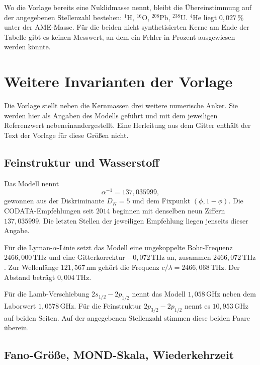 \documentclass[11pt,a4paper]{article}
\theoremstyle{definition}
\theoremstyle{remark}
\newcommand{\phig}{\phi}
\begin{document}
Wo die Vorlage bereits eine Nuklidmasse nennt, bleibt die Übereinstimmung auf der angegebenen Stellenzahl bestehen: \(^{1}\mathrm{H}\), \(^{16}\mathrm{O}\), \(^{208}\mathrm{Pb}\), \(^{238}\mathrm{U}\). \(^{4}\mathrm{He}\) liegt \(0{,}027\,\%\) unter der AME-Masse. Für die beiden nicht synthetisierten Kerne am Ende der Tabelle gibt es keinen Messwert, an dem ein Fehler in Prozent ausgewiesen werden könnte.

\section{Weitere Invarianten der Vorlage}
\label{sec:invarianten}

Die Vorlage stellt neben die Kernmassen drei weitere numerische Anker. Sie werden hier als Angaben des Modells geführt und mit dem jeweiligen Referenzwert nebeneinandergestellt. Eine Herleitung aus dem Gitter enthält der Text der Vorlage für diese Größen nicht.

\subsection{Feinstruktur und Wasserstoff}

Das Modell nennt
\begin{equation}
\alpha^{-1}=137{,}035999,
\end{equation}
gewonnen aus der Diskriminante \(D_K=5\) und dem Fixpunkt \((\phig,1-\phig)\). Die CODATA-Empfehlungen seit \(2014\) beginnen mit denselben neun Ziffern \(137{,}035999\). Die letzten Stellen der jeweiligen Empfehlung liegen jenseits dieser Angabe.

Für die Lyman-\(\alpha\)-Linie setzt das Modell eine ungekoppelte Bohr-Frequenz \(2466{,}000\,\mathrm{THz}\) und eine Gitterkorrektur \(+0{,}072\,\mathrm{THz}\) an, zusammen \(2466{,}072\,\mathrm{THz}\). Zur Wellenlänge \(121{,}567\,\mathrm{nm}\) gehört die Frequenz \(c/\lambda=2466{,}068\,\mathrm{THz}\). Der Abstand beträgt \(0{,}004\,\mathrm{THz}\).

Für die Lamb-Verschiebung \(2s_{1/2}-2p_{1/2}\) nennt das Modell \(1{,}058\,\mathrm{GHz}\) neben dem Laborwert \(1{,}0578\,\mathrm{GHz}\). Für die Feinstruktur \(2p_{3/2}-2p_{1/2}\) nennt es \(10{,}953\,\mathrm{GHz}\) auf beiden Seiten. Auf der angegebenen Stellenzahl stimmen diese beiden Paare überein.

\subsection{Fano-Größe, MOND-Skala, Wiederkehrzeit}
\end{document}

